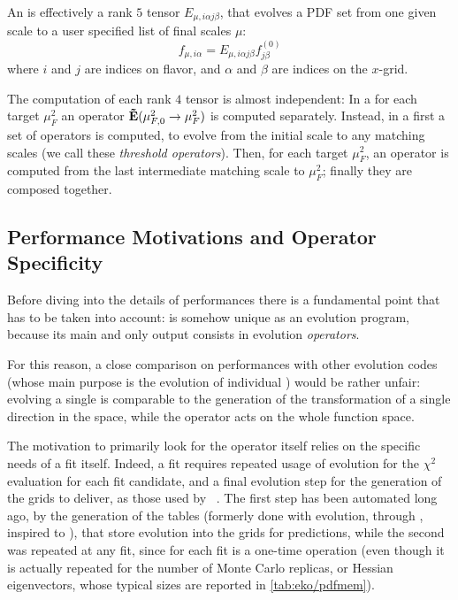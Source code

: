 An \eko{} is effectively a rank $5$ tensor $E_{\mu,i \alpha j \beta}$, that
evolves a PDF set from one given scale to a user specified list of final scales
$\mu$:
\begin{equation}
    f_{\mu,i\alpha} = E_{\mu,i \alpha j \beta} f^{(0)}_{j \beta}
\end{equation}
where $i$ and $j$ are indices on flavor, and $\alpha$ and $\beta$ are indices on the $x$-grid.

The computation of each rank $4$ tensor is almost independent:
In a \ffns{} for each target $\mu_F^2$ an operator $\vb{\tilde E}(\mu_{F,0}^2 \to \mu_F^2)$ is computed separately.
Instead, in a \vfns{} first a set of operators is computed, to evolve from the
initial scale to any matching scales (we call these \textit{threshold
operators}). Then, for each target $\mu_F^2$, an operator is computed
from the last intermediate matching scale to $\mu_F^2$; finally
they are composed together.

\subsection{Performance Motivations and Operator Specificity}
\label{sec:eko/perf-motiv}

Before diving into the details of \eko{} performances there is a fundamental
point that has to be taken into account: \eko{} is somehow unique as an
evolution program, because its main and only output consists in evolution
\textit{operators}.

For this reason, a close comparison on performances with other evolution codes
(whose main purpose is the evolution of individual \pdfs) would be rather
unfair: evolving a single \pdf{} is comparable to the generation of the
transformation of a single direction in the \pdf{} space, while the operator acts
on the whole function space.

The motivation to primarily look for the operator itself relies on the specific
needs of a \pdf{} fit itself.
Indeed, a fit requires repeated usage of evolution for the $\chi^2$ evaluation
for each fit candidate, and a final evolution step for the generation of the
\pdf{} grids to deliver, as those used by \lhapdf{}~\cite{Buckley:2014ana}.
The first step has been automated long ago, by the generation of the
\fk{} tables (formerly done with \apfel{} evolution, through
\href{https://github.com/NNPDF/apfelcomb}{\apfelcomb}, inspired to
\cite{Bertone:2016lga}), that store \pdf{} evolution into the grids for
predictions, while the second was repeated at any fit, since for each fit is a
one-time operation (even though it is actually repeated for the number of Monte
Carlo replicas, or Hessian eigenvectors, whose typical sizes are reported in
\cref{tab:eko/pdfmem}).

